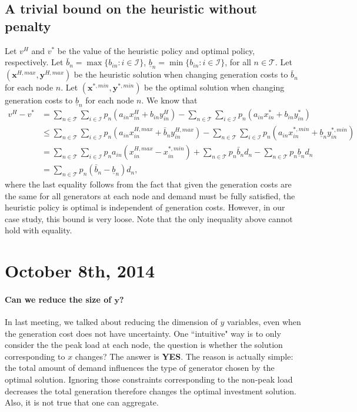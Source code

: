 \documentclass[10pt]{article}
\theoremstyle{plain}
\theoremstyle{definition}
\theoremstyle{remark}
\newcommand{\mcal}{\mathcal}
\newcommand{\bx}{\mathbf{x}}
\newcommand{\by}{\mathbf{y}}
\newcommand{\T}{\mathcal{T}}
\begin{document}
\subsection*{A trivial bound on the heuristic without penalty}
Let $v^H$ and $v^*$ be the value of the heuristic policy and optimal policy, respectively.
Let $\bar{b}_{n} = \max\{b_{in}: i\in \mcal{I}\}$, $\underline{b}_{n} = \min\{b_{in}: i\in \mcal{I}\}$,
for all $n\in \T$.
Let $(\bx^{H,max}, \by^{H,max})$ be the heuristic solution when changing generation costs
to $\bar{b}_{n}$ for each node $n$.
Let $(\bx^{*,min}, \by^{*,min})$ be the optimal solution when changing generation costs
to $\underline{b}_{n}$ for each node $n$.
We know that
\begin{align*}
v^H - v^* & = \sum_{n\in \T}\sum_{i\in \mcal{I}}p_n(a_{in}x^H_{in} + b_{in}y^H_{in})
			- \sum_{n\in \T}\sum_{i\in \mcal{I}}p_n(a_{in}x^*_{in} + b_{in}y^*_{in})\\
& \le  \sum_{n\in \T}\sum_{i\in \mcal{I}}p_n(a_{in}x^{H,max}_{in} + \bar{b}_{n}y^{H,max}_{in})
	- \sum_{n\in \T}\sum_{i\in \mcal{I}}p_n(a_{in}x^{*,min}_{in} + \underline{b}_{n}y^{*,min}_{in})\\
& = \sum_{n\in \T}\sum_{i\in \mcal{I}}p_na_{in}(x^{H,max}_{in} - x^{*,min}_{in})
	+  \sum_{n\in \T}p_n\bar{b}_{n}d_n - \sum_{n\in \T}p_n\underline{b}_{n}d_n\\
& = \sum_{n\in \T}p_n(\bar{b}_{n} - \underline{b}_{n})d_n,
\end{align*}
where the last equality follows from the fact that
given the generation costs are the same for all generators at each node
and demand must be fully satisfied, the heuristic policy is optimal is independent
of generation costs. However, in our case study, this bound is very loose.
Note that the only inequality above cannot hold with equality.


\section*{October 8th, 2014}
\paragraph{Can we reduce the size of $\by$?}
In last meeting, we talked about reducing the dimension of $y$ variables,
even when the generation cost does not have uncertainty.
One ``intuitive" way is to only consider the the peak load at each node,
the question is whether the solution corresponding to $x$ changes?
The answer is {\bf YES}. The reason is actually simple: the total amount of
demand influences the type of generator chosen by the optimal solution.
Ignoring those constraints corresponding to the non-peak load decreases
the total generation therefore changes the optimal investment solution.
Also, it is not true that one can aggregate.
\end{document}
